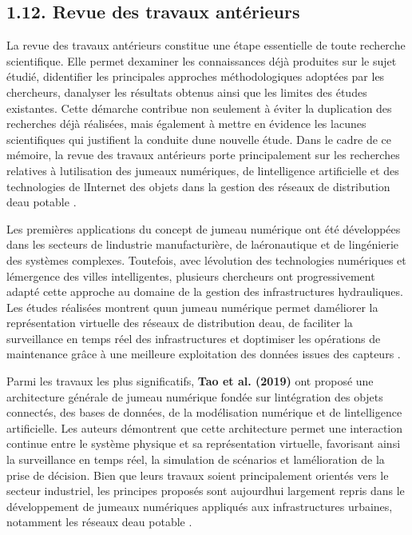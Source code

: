 \documentclass[12pt,a4paper,oneside]{report}
\begin{document}
\subsection{\texorpdfstring{\textbf{1.12. Revue des travaux
antérieurs}}{1.12. Revue des travaux antérieurs}}\label{revue-des-travaux-antuxe9rieurs}

La revue des travaux antérieurs constitue une étape essentielle de toute
recherche scientifique. Elle permet d\textquotesingle examiner les
connaissances déjà produites sur le sujet étudié,
d\textquotesingle identifier les principales approches méthodologiques
adoptées par les chercheurs, d\textquotesingle analyser les résultats
obtenus ainsi que les limites des études existantes. Cette démarche
contribue non seulement à éviter la duplication des recherches déjà
réalisées, mais également à mettre en évidence les lacunes scientifiques
qui justifient la conduite d\textquotesingle une nouvelle étude. Dans le
cadre de ce mémoire, la revue des travaux antérieurs porte
principalement sur les recherches relatives à
l\textquotesingle utilisation des jumeaux numériques, de
l\textquotesingle intelligence artificielle et des technologies de
l\textquotesingle Internet des objets dans la gestion des réseaux de
distribution d\textquotesingle eau potable \cite{ref75}.

Les premières applications du concept de jumeau numérique ont été
développées dans les secteurs de l\textquotesingle industrie
manufacturière, de l\textquotesingle aéronautique et de
l\textquotesingle ingénierie des systèmes complexes. Toutefois, avec
l\textquotesingle évolution des technologies numériques et
l\textquotesingle émergence des villes intelligentes, plusieurs
chercheurs ont progressivement adapté cette approche au domaine de la
gestion des infrastructures hydrauliques. Les études réalisées montrent
qu\textquotesingle un jumeau numérique permet
d\textquotesingle améliorer la représentation virtuelle des réseaux de
distribution d\textquotesingle eau, de faciliter la surveillance en
temps réel des infrastructures et d\textquotesingle optimiser les
opérations de maintenance grâce à une meilleure exploitation des données
issues des capteurs \cite{ref8}.

Parmi les travaux les plus significatifs, \textbf{Tao et al. (2019)} ont
proposé une architecture générale de jumeau numérique fondée sur
l\textquotesingle intégration des objets connectés, des bases de
données, de la modélisation numérique et de
l\textquotesingle intelligence artificielle. Les auteurs démontrent que
cette architecture permet une interaction continue entre le système
physique et sa représentation virtuelle, favorisant ainsi la
surveillance en temps réel, la simulation de scénarios et
l\textquotesingle amélioration de la prise de décision. Bien que leurs
travaux soient principalement orientés vers le secteur industriel, les
principes proposés sont aujourd\textquotesingle hui largement repris
dans le développement de jumeaux numériques appliqués aux
infrastructures urbaines, notamment les réseaux d\textquotesingle eau
potable \cite{ref17}.
\end{document}

